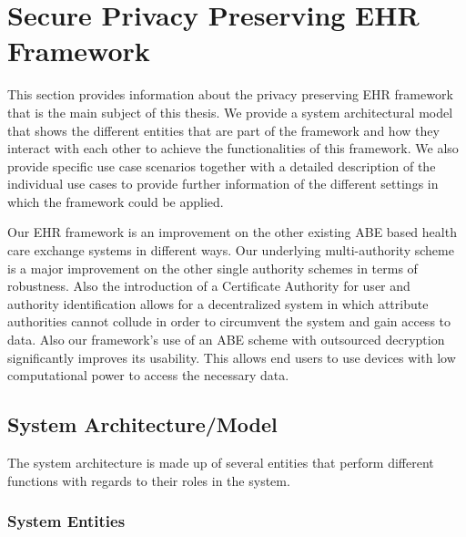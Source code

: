 \section{Secure Privacy Preserving EHR Framework}

This section provides information about the privacy preserving EHR framework that is the main subject of this thesis. We provide a system architectural model that shows the different entities that are part of the framework and how they interact with each other to achieve the functionalities of this framework. We also provide specific use case scenarios together with a detailed description of the individual use cases to provide further information of the different settings in which the framework could be applied.

Our EHR framework is an improvement on the other existing ABE based health care exchange systems in different ways. Our underlying multi-authority scheme is a major improvement on the other single authority schemes in terms of robustness. Also the introduction of a Certificate Authority for user and authority identification allows for a decentralized system in which attribute authorities cannot collude in order to circumvent the system and gain access to data. Also our framework's use of an ABE scheme with outsourced decryption significantly improves its usability. This allows end users to use devices with low computational power to access the necessary data.

\subsection{System Architecture/Model}

The system architecture is made up of several entities that perform different functions with regards to their roles in the system.

\subsubsection{System Entities}

